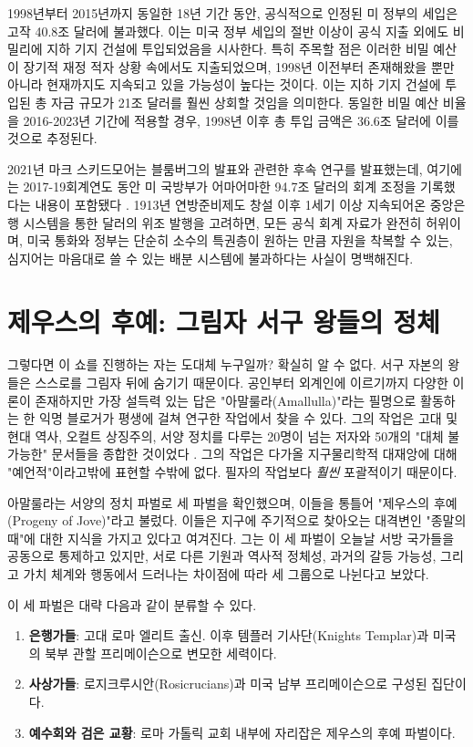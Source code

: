 \documentclass[10pt,twocolumn,letterpaper]{article}
\begin{document}
1998년부터 2015년까지 동일한 18년 기간 동안, 공식적으로 인정된 미 정부의 세입은 고작 40.8조 달러에 불과했다. 이는 미국 정부 세입의 절반 이상이 공식 지출 외에도 비밀리에 지하 기지 건설에 투입되었음을 시사한다\cite{15}. 특히 주목할 점은 이러한 비밀 예산이 장기적 재정 적자 상황 속에서도 지출되었으며, 1998년 이전부터 존재해왔을 뿐만 아니라 현재까지도 지속되고 있을 가능성이 높다는 것이다. 이는 지하 기지 건설에 투입된 총 자금 규모가 21조 달러를 훨씬 상회할 것임을 의미한다. 동일한 비밀 예산 비율을 2016-2023년 기간에 적용할 경우, 1998년 이후 총 투입 금액은 36.6조 달러에 이를 것으로 추정된다.

2021년 마크 스키드모어는 블룸버그의 발표와 관련한 후속 연구를 발표했는데, 여기에는 2017-19회계연도 동안 미 국방부가 어마어마한 94.7조 달러의 회계 조정을 기록했다는 내용이 포함됐다 \cite{17,18}. 1913년 연방준비제도 창설 이후 1세기 이상 지속되어온 중앙은행 시스템을 통한 달러의 위조 발행을 고려하면\cite{37}, 모든 공식 회계 자료가 완전히 허위이며, 미국 통화와 정부는 단순히 소수의 특권층이 원하는 만큼 자원을 착복할 수 있는, 심지어는 마음대로 쓸 수 있는 배분 시스템에 불과하다는 사실이 명백해진다.

\section{제우스의 후예: 그림자 서구 왕들의 정체}
그렇다면 이 쇼를 진행하는 자는 도대체 누구일까? 확실히 알 수 없다. 서구 자본의 왕들은 스스로를 그림자 뒤에 숨기기 때문이다. 공인부터 외계인에 이르기까지 다양한 이론이 존재하지만 가장 설득력 있는 답은 "아말룰라(Amallulla)"라는 필명으로 활동하는 한 익명 블로거가 평생에 걸쳐 연구한 작업에서 찾을 수 있다. 그의 작업은 고대 및 현대 역사, 오컬트 상징주의, 서양 정치를 다루는 20명이 넘는 저자와 50개의 "대체 불가능한" 문서들을 종합한 것이었다 \cite{33,34}. 그의 작업은 다가올 지구물리학적 대재앙에 대해 "예언적"이라고밖에 표현할 수밖에 없다. 필자의 작업보다 \textit{훨씬} 포괄적이기 때문이다.

아말룰라는 서양의 정치 파벌로 세 파벌을 확인했으며, 이들을 통틀어 "제우스의 후예(Progeny of Jove)"라고 불렀다. 이들은 지구에 주기적으로 찾아오는 대격변인 "종말의 때"에 대한 지식을 가지고 있다고 여겨진다. 그는 이 세 파벌이 오늘날 서방 국가들을 공동으로 통제하고 있지만, 서로 다른 기원과 역사적 정체성, 과거의 갈등 가능성, 그리고 가치 체계와 행동에서 드러나는 차이점에 따라 세 그룹으로 나뉜다고 보았다.

이 세 파벌은 대략 다음과 같이 분류할 수 있다.

\begin{flushleft}
\begin{enumerate}
    \item \textbf{은행가들}: 고대 로마 엘리트 출신. 이후 템플러 기사단(Knights Templar)과 미국의 북부 관할 프리메이슨으로 변모한 세력이다.
    \item \textbf{사상가들}: 로지크루시안(Rosicrucians)과 미국 남부 프리메이슨으로 구성된 집단이다.
    \item \textbf{예수회와 검은 교황}: 로마 가톨릭 교회 내부에 자리잡은 제우스의 후예 파벌이다.
\end{enumerate}
\end{flushleft}
\end{document}
